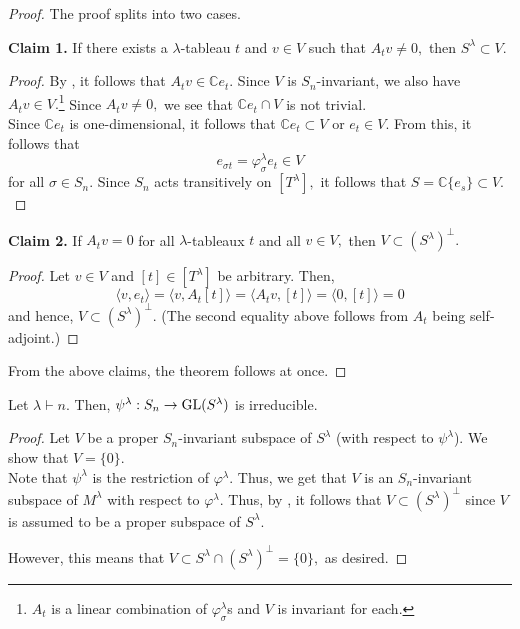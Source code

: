\begin{proof} The proof splits into two cases.

	\textbf{Claim 1.} If there exists a $\lambda$-tableau $t$ and $v \in V$ such that $A_tv \neq 0,$ then $S^\lambda \subset V.$

	\begin{proof} 
		By , it follows that $A_tv \in \mathbb{C}e_t.$ Since $V$ is $S_n$-invariant, we also have $A_tv \in V.$\footnote{$A_t$ is a linear combination of $\varphi^\lambda_\sigma$s and $V$ is invariant for each.} Since $A_tv \neq 0,$ we see that $\mathbb{C}e_t \cap V$ is not trivial.\\
		Since $\mathbb{C}e_t$ is one-dimensional, it follows that $\mathbb{C}e_t \subset V$ or $e_t \in V.$ From this, it follows that
		\begin{equation*} 
			e_{\sigma t} = \varphi^\lambda_\sigma e_t \in V
		\end{equation*}
		for all $\sigma \in S_n.$ Since $S_n$ acts transitively on $[T^\lambda],$ it follows that $S = \mathbb{C}\{e_s\} \subset V.$
	\end{proof}

	\textbf{Claim 2.} If $A_tv = 0$ for all $\lambda$-tableaux $t$ and all $v \in V,$ then $V \subset (S^\lambda)^\perp.$

	\begin{proof}
		Let $v \in V$ and $[t] \in [T^\lambda]$ be arbitrary. Then, 
		\begin{equation*} 
			\langle v, e_t\rangle = \langle v, A_t[t]\rangle = \langle A_tv, [t]\rangle = \langle 0, [t]\rangle = 0
		\end{equation*}
		and hence, $V \subset (S^\lambda)^\perp.$ (The second equality above follows from $A_t$ being self-adjoint.)
	\end{proof}

	From the above claims, the theorem follows at once.
\end{proof}

\begin{cor} \label{cor:psilambdaisirred}
	Let $\lambda \vdash n.$ Then, $\psi^\lambda : S_n \to \operatorname{GL}(S^\lambda)$ is irreducible.
\end{cor}
\begin{proof} 
	Let $V$ be a proper $S_n$-invariant subspace of $S^\lambda$ (with respect to $\psi^\lambda$). We show that $V = \{0\}.$\\
	Note that $\psi^\lambda$ is the restriction of $\varphi^\lambda.$ Thus, we get that $V$ is an $S_n$-invariant subspace of $M^\lambda$ with respect to $\varphi^\lambda.$ Thus, by , it follows that $V \subset (S^\lambda)^\perp$ since $V$ is assumed to be a proper subspace of $S^\lambda.$

	However, this means that $V \subset S^\lambda \cap (S^\lambda)^\perp = \{0\},$ as desired.
\end{proof}

